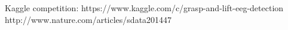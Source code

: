 \documentclass[final,leqno,onefignum,onetabnum]{siamltexmm}
\begin{document}



\begin{thebibliography}{1}
 Kaggle competition:  https://www.kaggle.com/c/grasp-and-lift-eeg-detection
 http://www.nature.com/articles/sdata201447
\end{thebibliography} 
\end{document}
